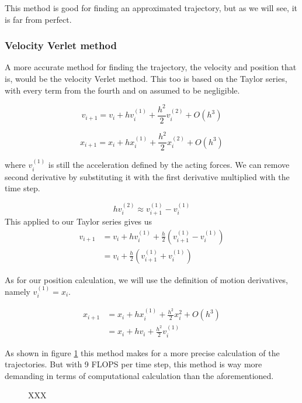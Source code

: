 \documentclass[10pt]{article}
\begin{document}
\begin{multicols}{2}
This method is good for finding an approximated trajectory, but as we will
see, it is far from perfect.


\subsubsection{Velocity Verlet method}
A more accurate method for finding the trajectory, the velocity and
position that is, would be the velocity Verlet method. This too is based on
the Taylor series, with every term from the fourth and on assumed to be
negligible.

\begin{equation}
    v_{i+1} = v_i +hv_i^{(1)}+\frac{h^2}{2}v_i^{(2)}+O(h^3)
\end{equation}

\begin{equation}
    x_{i+1} = x_i +hx_i^{(1)}+\frac{h^2}{2}x_i^{(2)}+O(h^3)
\end{equation}

where $v_i^{(1)}$ is still the acceleration defined by the acting forces.
We can remove second derivative by substituting it with the first
derivative multiplied with the time step. 

\begin{equation}
    hv_i^{(2)} \approx v_{i+1}^{(1)}-v_i^{(1)}\nonumber
\end{equation}
This applied to our Taylor series gives us
\begin{align}
    v_{i+1} &= v_i + hv_i^{(1)}+\frac{h}{2}\left(v_{i+1}^{(1)}-v_i^{(1)}\right)\nonumber\\
    &= v_i+\frac{h}{2}\left(v_{i+1}^{(1)}+v_i^{(1)}\right)
\end{align}

As for our position calculation, we will use the definition of motion
derivatives, namely $v_i^{(1)}=x_i$.

\begin{align}
    x_{i+1} &= x_i +hx_i^{(1)}+\frac{h^2}{2}x_i^{2}+O(h^3)\nonumber\\
    &= x_i + hv_i + \frac{h^2}{2}v_i^{(1)}
\end{align}

As shown in figure \cref{fig:XXX} this method makes for a more precise
calculation of the trajectories. But with 9 FLOPS per time step, this
method is way more demanding in terms of computational calculation than the
aforementioned.

\begin{figure}[htpb]
    \centering
    \caption{XXX}
    \label{fig:XXX}
\end{figure}


\end{multicols}
\end{document}
